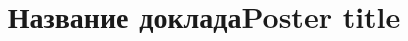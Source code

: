 \begin{Russian}
  \title{Название доклада}
\end{Russian}
\begin{English}
  \title{Poster title}
\end{English}

